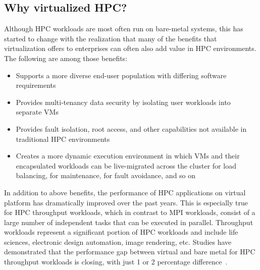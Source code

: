 \subsection{Why virtualized HPC?}
Although HPC workloads are most often run on bare-metal systems, this has started to change 
with the realization that many of the benefits that virtualization offers to enterprises 
can often also add value in HPC environments. The following are among those benefits:
\begin{itemize}
	\item Supports a more diverse end-user population with differing software requirements
	\item Provides multi-tenancy data security by isolating user workloads into separate VMs
	\item Provides fault isolation, root access, and other capabilities not available in traditional HPC environments
	\item Creates a more dynamic execution environment in which VMs and their encapsulated workloads 
	can be live-migrated across the cluster for load balancing, for maintenance, for fault avoidance, and so on
\end{itemize}

In addition to above benefits, the performance of HPC applications on virtual platform has dramatically 
improved over the past years. This is especially true for HPC throughput workloads, which in contrast to MPI workloads, 
consist of a large number of independent tasks that can be executed in parallel. Throughput workloads represent a 
significant portion of HPC workloads and include life sciences, electronic design automation, image rendering, etc. 
Studies have demonstrated that the performance gap between virtual and bare metal for HPC throughput workloads is 
closing, with just 1 or 2 percentage difference~\cite{michael2018overcommit}. 


